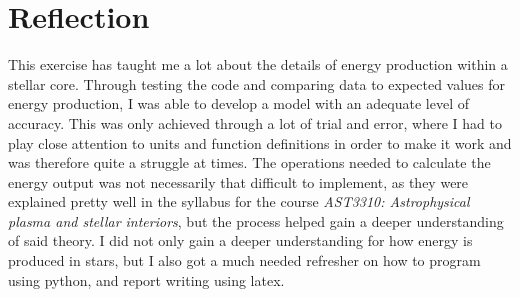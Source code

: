 \documentclass[10pt, nofootinbib, twocolumn]{revtex4-1}
\begin{document}
\section{Reflection}\label{sec:reflection}
This exercise has taught me a lot about the details of energy production within a stellar core. Through testing the code and comparing data to expected values for energy production, I was able to develop a model with an adequate level of accuracy. This was only achieved through a lot of trial and error, where I had to play close attention to units and function definitions in order to make it work and was therefore quite a struggle at times. The operations needed to calculate the energy output was not necessarily that difficult to implement, as they were explained pretty well in the syllabus for the course \textit{AST3310: Astrophysical plasma and stellar interiors}, but the process helped gain a deeper understanding of said theory. I did not only gain a deeper understanding for how energy is produced in stars, but I also got a much needed refresher on how to program using python, and report writing using latex. 







\end{document}
